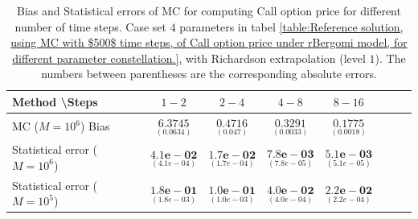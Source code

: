 \documentclass[11pt]{article}
\begin{document}
\begin{table}[h!]
	\centering
	\begin{tabular}{l*{6}{c}r}
		Method \textbackslash  Steps            & $1-2$ & $2-4$ & $4-8$ & $8-16$  \\
		\hline
		MC  ($M=10^6$) Bias   &$\underset{(0.0634 )}{\mathbf{6.3745}}$  & $\underset{(0.047)}{\mathbf{0.4716}}$  & $\underset{( 0.0033 )}{\mathbf{0.3291}}$  & $\underset{( 0.0018)}{\mathbf{0.1775}}$ \\	
		
		Statistical error ($M=10^6$)   & $\underset{(  4.1e-04)}{\mathbf{4.1e-02}}$  & $\underset{(1.7e-04 )}{\mathbf{1.7e-02}}$  & $\underset{(7.8e-05)}{\mathbf{7.8e-03}}$ & $\underset{(5.1e-05 )}{\mathbf{5.1e-03}}$ \\	
		
		Statistical error ($M=10^5$)  & $\underset{(  1.8e-03)}{\mathbf{1.8e-01}}$  & $\underset{(1.0e-03 )}{\mathbf{1.0e-01}}$  & $\underset{(4.0e-04)}{\mathbf{4.0e-02}}$ & $\underset{(2.2e-04 )}{\mathbf{2.2e-02}}$ \\
		\hline
	\end{tabular}
	\caption{Bias and Statistical errors of MC   for computing Call option price  for different number of time steps. Case set $4$ parameters in tabel \ref{table:Reference solution, using MC with $500$ time steps, of Call option price under rBergomi model, for different parameter constellation.}, with Richardson extrapolation (level $1$). The numbers between parentheses are the corresponding absolute errors.}
	\label{Bias and Statistical errors of MC ($M=10^6$)  for computing Call option price  for different number of time steps. Case set $4$ parameters, with Richardson extrapolation (level1). The numbers between parentheses are the corresponding absolute errors.}
\end{table}
\end{document}
